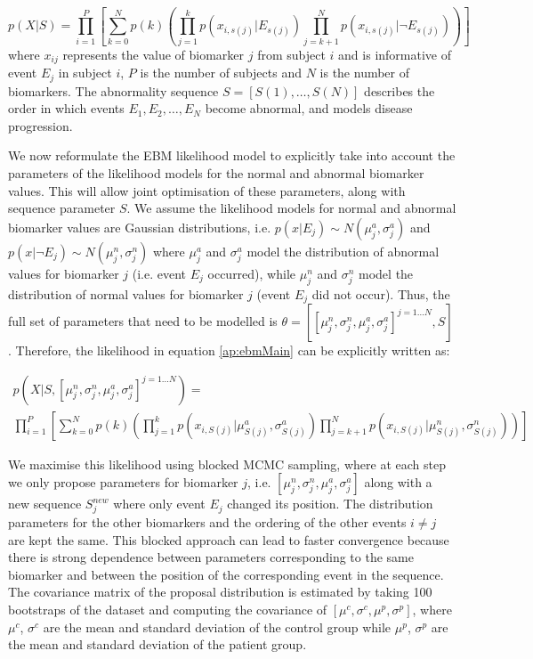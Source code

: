 \begin{equation}
\label{ap:ebmMain}
 p(X|S) = \prod_{i=1}^P \left[ \sum_{k=0}^N p(k) \left( \prod_{j=1}^k p\left(x_{i,s(j)} | E_{s(j)} \right) \prod_{j=k+1}^N p\left(x_{i,s(j)} | \neg E_{s(j)}\right) \right) \right]
\end{equation}
where $x_{ij}$ represents the value of biomarker $j$ from subject $i$  and is informative of event $E_j$ in subject $i$, $P$ is the number of subjects and $N$ is the number of biomarkers. The abnormality sequence $S = [S(1), \dots, S(N)]$ describes the order in which events $E_1, E_2, \dots , E_N$ become abnormal, and models disease progression. 

We now reformulate the EBM likelihood model to explicitly take into account the parameters of the likelihood models for the normal and abnormal biomarker values. This will allow joint optimisation of these parameters, along with sequence parameter $S$. We assume the likelihood models for normal and abnormal biomarker values are Gaussian distributions, i.e. $p(x|E_j) \sim N(\mu^a_j, \sigma^a_j)$ and $p(x|\neg E_j) \sim N(\mu^n_j, \sigma^n_j)$ where $\mu^a_j$ and $\sigma^a_j$ model the distribution of abnormal values for biomarker $j$ (i.e. event $E_j$ occurred), while $\mu^n_j$ and $\sigma^n_j$ model the distribution of normal values for biomarker $j$ (event $E_j$ did not occur). Thus, the full set of parameters that need to be modelled is $\theta = \left[ [\mu^n_j, \sigma^n_j, \mu^a_j, \sigma^a_j]^{j=1 \dots N}, S \right]$. Therefore, the likelihood in equation \ref{ap:ebmMain} can be explicitly written as:


\begin{multline}
\label{ap:ebmExplicit}
 p(X|S, [\mu^n_j, \sigma^n_j, \mu^a_j, \sigma^a_j]^{j=1 \dots N}) = \\ \prod_{i=1}^P \left[ \sum_{k=0}^N p(k) \left( \prod_{j=1}^k p\left(x_{i,S(j)} | \mu^a_{S(j)}, \sigma^a_{S(j)} \right) \prod_{j=k+1}^N p\left(x_{i,S(j)} | \mu^n_{S(j)}, \sigma^n_{S(j)} \right) \right) \right]
\end{multline}


We maximise this likelihood using blocked MCMC sampling, where at each step we only propose parameters for biomarker $j$, i.e. $[\mu^n_j, \sigma^n_j, \mu^a_j, \sigma^a_j]$ along with a new sequence $S_j^{new}$ where only event $E_j$ changed its position. The distribution parameters for the other biomarkers and the ordering of the other events $i \neq j$ are kept the same. This blocked approach can lead to faster convergence because there is strong dependence between parameters corresponding to the same biomarker and between the position of the corresponding event in the sequence. The covariance matrix of the proposal distribution is estimated by taking 100 bootstraps of the dataset and computing the covariance of $[\mu^c, \sigma^c, \mu^p, \sigma^p]$, where $\mu^c$, $\sigma^c$ are the mean and standard deviation of the control group while $\mu^p$, $\sigma^p$ are the mean and standard deviation of the patient group.

